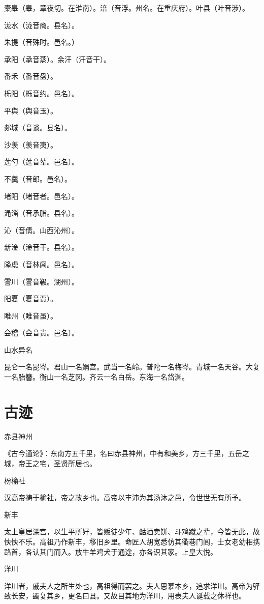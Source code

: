 \documentclass[a4paper,12pt,UTF8,twoside]{ctexbook}
\begin{document}
	橐皋（皋，章夜切。在淮南）。涪（音浮。州名。在重庆府）。叶县（叶音涉）。
	
	泷水（泷音商。县名）。
	
	朱提（音殊时。邑名。）
	
	承阳（承音蒸）。余汗（汗音干）。
	
	番禾（番音盘）。
	
	栎阳（栎音约。邑名）。
	
	平舆（舆音玉）。
	
	郯城（音谈。县名）。
	
	沙羡（羡音夷）。
	
	莲勺（莲音辇。邑名）。
	
	不羹（音郎。邑名）。
	
	堵阳（堵音者。邑名）。
	
	渑淄（音承脂。县名）。
	
	沁（音倩。山西沁州）。
	
	新淦（淦音干。县名）。
	
	隆虑（音林闾。邑名）。
	
	霅川（霅音靸。湖州）。
	
	阳夏（夏音贾）。
	
	睢州（睢音虽）。
	
	会稽（会音贵。邑名）。
	
	山水异名
	
	昆仑一名昆岑。君山一名娲宫。武当一名岭。普陀一名梅岑。青城一名天谷。大复一名胎簪。衡山一名芝冈。齐云一名白岳。东海一名岱渊。
	
	
	
	\chapter{古迹}
	
	
	赤县神州
	
	《古今通论》：东南方五千里，名曰赤县神州，中有和美乡，方三千里，五岳之城，帝王之宅，圣贤所居也。
	
	枌榆社
	
	汉高帝祷于榆社，帝之故乡也。高帝以丰沛为其汤沐之邑，令世世无有所予。
	
	新丰
	
	太上皇居深宫，以生平所好，皆贩徒少年、酤酒卖饼、斗鸡蹴之辈，今皆无此，故怏怏不乐。高祖乃作新丰，移旧乡里。命匠人胡宽悉仿其衢巷门闾，士女老幼相携路首，各认其门而入。放牛羊鸡犬于通途，亦各识其家。上皇大悦。
	
	洋川
	
	洋川者，戚夫人之所生处也，高祖得而罢之。夫人思慕本乡，追求洋川。高帝为驿致长安，蠲复其乡，更名曰县。又故目其地为洋川，用表夫人诞载之休祥也。
	
\end{document}

